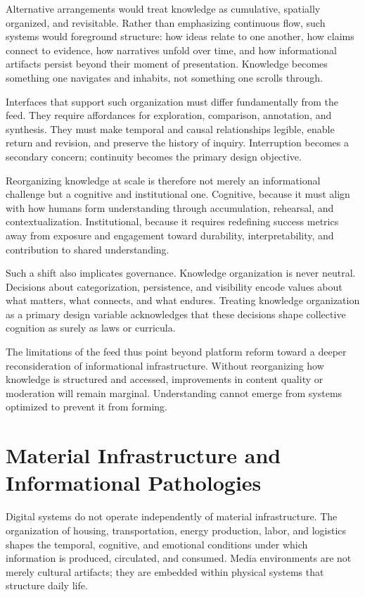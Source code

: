 \documentclass[12pt]{article}
\begin{document}
Alternative arrangements would treat knowledge as cumulative, spatially organized, and revisitable. Rather than emphasizing continuous flow, such systems would foreground structure: how ideas relate to one another, how claims connect to evidence, how narratives unfold over time, and how informational artifacts persist beyond their moment of presentation. Knowledge becomes something one navigates and inhabits, not something one scrolls through.

Interfaces that support such organization must differ fundamentally from the feed. They require affordances for exploration, comparison, annotation, and synthesis. They must make temporal and causal relationships legible, enable return and revision, and preserve the history of inquiry. Interruption becomes a secondary concern; continuity becomes the primary design objective.

Reorganizing knowledge at scale is therefore not merely an informational challenge but a cognitive and institutional one. Cognitive, because it must align with how humans form understanding through accumulation, rehearsal, and contextualization. Institutional, because it requires redefining success metrics away from exposure and engagement toward durability, interpretability, and contribution to shared understanding.

Such a shift also implicates governance. Knowledge organization is never neutral. Decisions about categorization, persistence, and visibility encode values about what matters, what connects, and what endures. Treating knowledge organization as a primary design variable acknowledges that these decisions shape collective cognition as surely as laws or curricula.

The limitations of the feed thus point beyond platform reform toward a deeper reconsideration of informational infrastructure. Without reorganizing how knowledge is structured and accessed, improvements in content quality or moderation will remain marginal. Understanding cannot emerge from systems optimized to prevent it from forming.

\section{Material Infrastructure and Informational Pathologies}

Digital systems do not operate independently of material infrastructure. The organization of housing, transportation, energy production, labor, and logistics shapes the temporal, cognitive, and emotional conditions under which information is produced, circulated, and consumed. Media environments are not merely cultural artifacts; they are embedded within physical systems that structure daily life.
\end{document}
